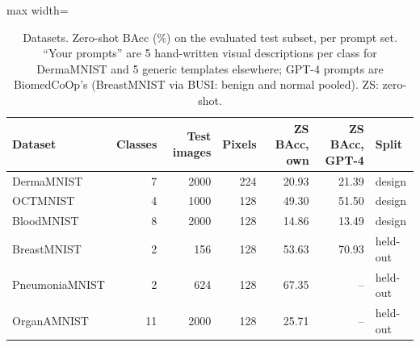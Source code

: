 \begin{table}[t]
\centering
\small
\caption{Datasets. Zero-shot BAcc (\%) on the evaluated test subset, per prompt set. ``Your prompts'' are 5 hand-written visual descriptions per class for DermaMNIST and 5 generic templates elsewhere; GPT-4 prompts are BiomedCoOp's (BreastMNIST via BUSI: benign and normal pooled). ZS: zero-shot.}
\label{tab:T1_datasets}
\begin{adjustbox}{max width=\linewidth}
\begin{tabular}{lrrrrrl}
\toprule
Dataset & Classes & Test images & Pixels & ZS BAcc, own & ZS BAcc, GPT-4 & Split \\
\midrule
DermaMNIST & 7 & 2000 & 224 & 20.93 & 21.39 & design \\
OCTMNIST & 4 & 1000 & 128 & 49.30 & 51.50 & design \\
BloodMNIST & 8 & 2000 & 128 & 14.86 & 13.49 & design \\
BreastMNIST & 2 & 156 & 128 & 53.63 & 70.93 & held-out \\
PneumoniaMNIST & 2 & 624 & 128 & 67.35 & -- & held-out \\
OrganAMNIST & 11 & 2000 & 128 & 25.71 & -- & held-out \\
\bottomrule
\end{tabular}
\end{adjustbox}
\end{table}
